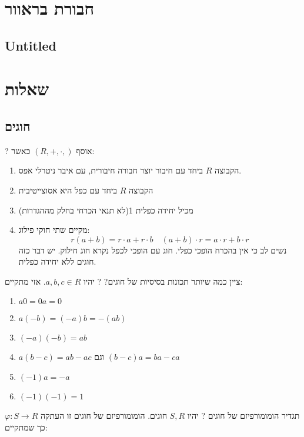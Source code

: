 \documentclass{tstextbook}
\begin{document}
\chapter{חבורת בראוור}

\section{Untitled}

\chapter{שאלות}

\section{חוגים}

?
אוסף \(\left( R,+,\cdot, \right)\)  כאשר:

\begin{enumerate}
  \item הקבוצה \(R\) ביחד עם חיבור יוצר חבורה חיבורית, עם איבר ניטרלי אפס. 


  \item הקבוצה \(R\) ביחד עם כפל היא אסוצייטיבית 


  \item מכיל יחידה כפלית 1(לא תנאי הכרחי בחלק מההגדרות) 


  \item מקיים שתי חוקי פילוג: 
$$r(a+b)=r\cdot a+r\cdot b\quad (a+b)\cdot r=a\cdot r+b\cdot r$$
נשים לב כי אין בהכרח הופכי כפלי. חוג עם הופכי לכפל נקרא חוג חילוק. יש דבר כזה חוגים ללא יחידה כפלית. 


\end{enumerate}
ציין כמה שיותר תכונות בסיסיות של חוגים?
?
יהיו \(a,b,c \in R\). אזי מתקיים:

\begin{enumerate}
  \item \(a 0=0a=0\)


  \item \(a(-b)=(-a)b=-(ab)\)


  \item \((-a)(-b)=ab\)


  \item \(a(b-c)=ab-ac\) וגם \((b-c)a=ba-ca\)


  \item \((-1)a=-a\)


  \item \((-1)(-1)=1\)


\end{enumerate}
תגדיר הומומורפיזם של חוגים
?
יהיו \(S,R\) חוגים. הומומורפיזם של חוגים זו העתקה \(\varphi:S\to R\) כך שמתקיים:
\end{document}
